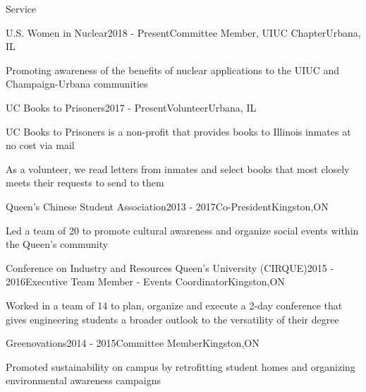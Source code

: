 \documentclass{resume2} %
\begin{document}
\begin{rSection}{Service}

	\begin{rSubsection}{U.S. Women in Nuclear}{2018 - Present}{Committee Member, UIUC Chapter}{Urbana, IL}
		\item Promoting awareness of the benefits of nuclear applications to the UIUC and Champaign-Urbana communities
	\end{rSubsection}

	\begin{rSubsection}{UC Books to Prisoners}{2017 - Present}{Volunteer}{Urbana, IL}
		\item UC Books to Prisoners is a non-profit that provides books to Illinois inmates at no cost via mail
		\item As a volunteer, we read letters from inmates and select books that most closely meets their requests to send to them
	\end{rSubsection}
	
	\begin{rSubsection}{Queen's Chinese Student Association}{2013 - 2017}{Co-President}{Kingston,ON}
		\item Led a team of 20 to promote cultural awareness and organize social events within the Queen's community
	\end{rSubsection}

	\begin{rSubsection}{Conference on Industry and Resources Queen's University (CIRQUE)}{2015 - 2016}{Executive Team Member - Events Coordinator}{Kingston,ON}
		\item Worked in a team of 14 to plan, organize and execute a 2-day conference that gives engineering students a broader outlook to the versatility of their degree
	\end{rSubsection}	
\iffalse
	\begin{rSubsection}{Queen's Association for Technology in Medicine and Biology}{2015 - 2016}{Vice President of Publicity }{Kingston,ON}
		\item Collaborated with a small executive team to organize a lecture series where faculty and students present their work that pertains to the application of technology in medicine and biology
	\end{rSubsection}	
\fi
	\begin{rSubsection}{Greenovations}{2014 - 2015}{Committee Member}{Kingston,ON}
		\item Promoted sustainability on campus by retrofitting student homes and organizing environmental awareness campaigns 
	\end{rSubsection}	
	
\end{rSection}
\end{document}
